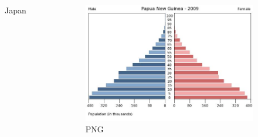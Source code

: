 \begin{frame}[t]
\begin{adjustwidth}{-2em}{-1.5em}
\begin{columns}
\begin{figure}
                \caption{\large Japan}
            \end{figure}
            \begin{figure}
                \includegraphics[width=1\columnwidth]{../images/pop-pyramid-png-2009.png}
                \caption{\large PNG}
            \end{figure}
    \end{columns}
    \end{adjustwidth}
\end{frame}

